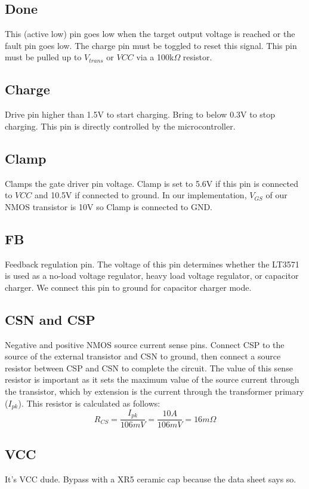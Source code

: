 \documentclass{article}
\begin{document}
	\subsection{Done}
	This (active low) pin goes low when the target output voltage is reached or the fault pin goes low. The charge pin must be toggled to reset this signal. This pin must be pulled up to $V_{trans}$ or $VCC$ via a 100k$\Omega$ resistor.
	
	\subsection{Charge}
	Drive pin higher than 1.5V to start charging. Bring to below 0.3V to stop charging. This pin is directly controlled by the microcontroller.
	
	\subsection{Clamp}
	Clamps the gate driver pin voltage. Clamp is set to 5.6V if this pin is connected to $VCC$ and 10.5V if connected to ground. In our implementation, $V_{GS}$ of our NMOS transistor is 10V so Clamp is connected to GND.
	
	\subsection{FB}
	Feedback regulation pin. The voltage of this pin determines whether the LT3571 is used as a no-load voltage regulator, heavy load voltage regulator, or capacitor charger. We connect this pin to ground for capacitor charger mode.
	
	\subsection{CSN and CSP}
	Negative and positive NMOS source current sense pins. Connect CSP to the source of the external transistor and CSN to ground, then connect a source resistor between CSP and CSN to complete the circuit. The value of this sense resistor is important as it sets the maximum value of the source current through the transistor, which by extension is the current through the transformer primary ($I_{pk}$). This resistor is calculated as follows:
	\[R_{CS} = \dfrac{I_{pk}}{106mV} = \dfrac{10A}{106mV} = 16m\Omega\]
	
	\subsection{VCC}
	It's VCC dude. Bypass with a XR5 ceramic cap because the data sheet says so.
	
\end{document}

